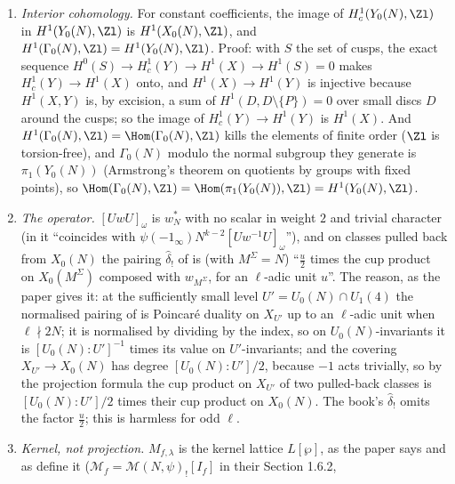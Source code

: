 \begin{remark}
\begin{enumerate}[label=(\arabic*)]
of $\ell$-power order that factor through $G$, namely $\gamma\mapsto\psi(d\bmod p)$ for primes $p\mid M$ with $\ell\mid p-1$; for $M=11$ and $\ell=5$ it is the unramified covering
$X_1(11)\to X_0(11)$''. For $X_1(N)\to X_0(N)$ this excess is measured by the Shimura subgroup (, ); it plays no part in the
comparison of integral structures.
\item \emph{Interior cohomology.} For constant coefficients, the image of $H^1_c(Y_0(N),\Zl)$ in $H^1(Y_0(N),\Zl)$ is $H^1(X_0(N),\Zl)$, and $H^1(\Gamma_0(N),\Zl)=H^1(Y_0(N),\Zl)$. Proof: with $S$ the set
of cusps, the exact sequence $H^0(S)\to H^1_c(Y)\to H^1(X)\to H^1(S)=0$ makes $H^1_c(Y)\to H^1(X)$ onto, and $H^1(X)\to H^1(Y)$ is injective because $H^1(X,Y)$ is, by excision, a sum of
$H^1(D,D\setminus\{P\})=0$ over small discs $D$ around the cusps; so the image of $H^1_c(Y)\to H^1(Y)$ is $H^1(X)$. And $H^1(\Gamma_0(N),\Zl)=\Hom(\Gamma_0(N),\Zl)$ kills the elements of finite order
($\Zl$ is torsion-free), and $\Gamma_0(N)$ modulo the normal subgroup they generate is $\pi_1(Y_0(N))$ (Armstrong's theorem on quotients by groups with fixed points), so
$\Hom(\Gamma_0(N),\Zl)=\Hom(\pi_1(Y_0(N)),\Zl)=H^1(Y_0(N),\Zl)$.
\item \emph{The operator.} $[UwU]_\omega$ is $w_N^*$ with no scalar in weight $2$ and trivial character (in \cite[Section 1.5.3]{DFG04} it ``coincides with $\psi(-1_\infty)N^{k-2}[Uw^{-1}U]_\omega$''),
and on classes pulled back from $X_0(N)$ the pairing $\hat\delta_!$ of \cite{DFG04} is (with $M^\Sigma=N$) ``$\frac u2$ times the cup product on $X_0(M^\Sigma)$ composed with $w_{M^\Sigma}$, for an $\ell$-adic unit
$u$''. The reason, as the paper gives it: at the sufficiently small level $U'=U_0(N)\cap U_1(4)$ the normalised pairing of \cite[Section 1.5.2]{DFG04} is Poincar\'e duality on $X_{U'}$ up to an
$\ell$-adic unit when $\ell\nmid2N$; it is normalised by dividing by the index, so on $U_0(N)$-invariants it is $[U_0(N):U']^{-1}$ times its value on $U'$-invariants; and the covering
$X_{U'}\to X_0(N)$ has degree $[U_0(N):U']/2$, because $-1$ acts trivially, so by the projection formula the cup product on $X_{U'}$ of two pulled-back classes is $[U_0(N):U']/2$ times their cup
product on $X_0(N)$. The book's $\hat\delta_!$ omits the factor $\frac u2$; this is harmless for odd $\ell$.
\item \emph{Kernel, not projection.} $M_{f,\lambda}$ is the kernel lattice $L[\wp]$, as the paper says and as \cite{DFG04} define it ($\mathcal M_f=\mathcal M(N,\psi)_![I_f]$ in their Section 1.6.2,

\end{enumerate}
\end{remark}

